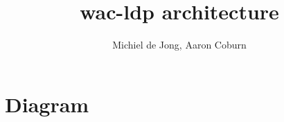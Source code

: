 \documentclass[10pt]{article}
\title{
  wac-ldp architecture
}
\author{Michiel de Jong, Aaron Coburn}
\begin{document}
\maketitle

\newcommand\StoreManagerBody{%
  + delete (url: URL): Promise<void>\\
  + exists (url: URL): Promise<boolean>\\
  + getResourceData (url: URL): Promise<ResourceData>\\
  + addQuad (quad: Quad): Promise<void>\\
  + deleteMatches (pattern: Pattern): Promise<void>\\
  + match (pattern: Pattern): Promise<Array<Quad>>\\
  + subjectsMatching (pattern: Pattern): Promise<Array<RdfJsTerm>>\\
  + predicatesMatching (pattern: Pattern): Promise<Array<RdfJsTerm>>\\
  + objectsMatching (pattern: Pattern): Promise<Array<RdfJsTerm>>\\
  + getRepresentation (url: URL, options?: any): Promise<ResourceData>\\
  + setRepresentation (url: URL, metaData: ResourceData): Promise<void>\\
  + load (url: URL): Promise<void>\\
  + save (url: URL): Promise<void>\\
  + patch (url: URL, sparqlQuery: string, appendOnly: boolean): Promise<void>\\
  + flushCache (url: URL): void\\
}

\section*{Diagram}
\end{document}
